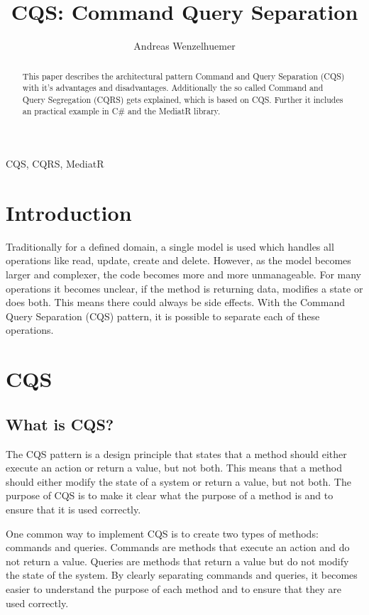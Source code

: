 \documentclass[11pt,conference]{IEEEtran}
\author{Andreas Wenzelhuemer}
\begin{document}
\title{CQS: Command Query Separation}

\maketitle

\begin{abstract}
This paper describes the architectural pattern Command and Query Separation (CQS) with it's advantages and disadvantages.
Additionally the so called Command and Query Segregation (CQRS) gets explained, which is based on CQS.
Further it includes an practical example in C\# and the MediatR library. 
\end{abstract}

\begin{IEEEkeywords}
CQS, CQRS, MediatR
\end{IEEEkeywords}

\section{Introduction}

Traditionally for a defined domain, a single model is used which handles all operations like read, update, create and delete.
However, as the model becomes larger and complexer, the code becomes more and more unmanageable.
For many operations it becomes unclear, if the method is returning data, modifies a state or does both.
This means there could always be side effects.
With the Command Query Separation (CQS) pattern, it is possible to separate each of these operations.

\section{CQS}

\subsection{What is CQS?}

The CQS pattern is a design principle that states that a method should either execute an action or return a value, but not both. This means that a method should either modify the state of a system or return a value, but not both. The purpose of CQS is to make it clear what the purpose of a method is and to ensure that it is used correctly.

One common way to implement CQS is to create two types of methods: commands and queries. Commands are methods that execute an action and do not return a value. Queries are methods that return a value but do not modify the state of the system. By clearly separating commands and queries, it becomes easier to understand the purpose of each method and to ensure that they are used correctly.
\end{document}
